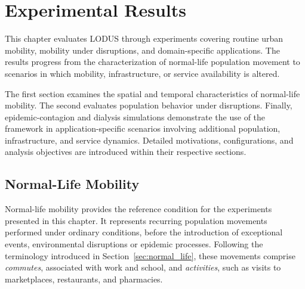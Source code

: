 \chapter{Experimental Results}
\label{chapter:experimental_results}

This chapter evaluates LODUS through experiments covering routine urban mobility, mobility under disruptions, and domain-specific applications. The results progress from the characterization of normal-life population movement to scenarios in which mobility, infrastructure, or service availability is altered.

The first section examines the spatial and temporal characteristics of normal-life mobility. The second evaluates population behavior under disruptions. Finally, epidemic-contagion and dialysis simulations demonstrate the use of the framework in application-specific scenarios involving additional population, infrastructure, and service dynamics. Detailed motivations, configurations, and analysis objectives are introduced within their respective sections.


\section{Normal-Life Mobility}

Normal-life mobility provides the reference condition for the experiments presented in this chapter. It represents recurring population movements performed under ordinary conditions, before the introduction of exceptional events, environmental disruptions or epidemic processes. Following the terminology introduced in Section~\ref{sec:normal_life}, these movements comprise \textit{commutes}, associated with work and school, and \textit{activities}, such as visits to marketplaces, restaurants, and pharmacies.

